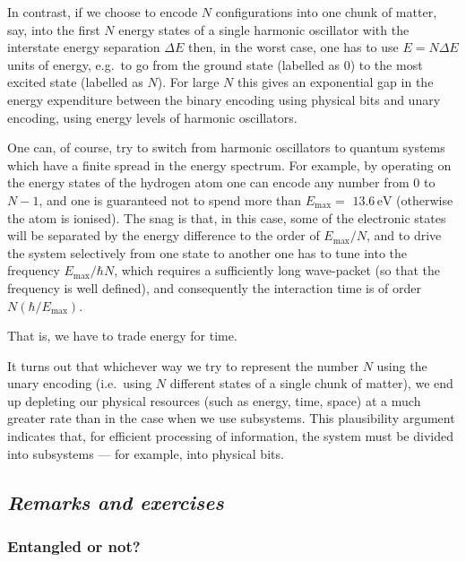 \documentclass[fleqn]{article}
\begin{document}
In contrast, if we choose to encode \(N\) configurations into one chunk of matter, say, into the first \(N\) energy states of a single harmonic oscillator with the interstate energy separation \(\Delta E\) then, in the worst case, one has to use \(E=N\Delta E\) units of energy, e.g.~to go from the ground state (labelled as \(0\)) to the most excited state (labelled as \(N\)).
For large \(N\) this gives an exponential gap in the energy expenditure between the binary encoding using physical bits and unary encoding, using energy levels of harmonic oscillators.

One can, of course, try to switch from harmonic oscillators to quantum systems which have a finite spread in the energy spectrum.
For example, by operating on the energy states of the hydrogen atom one can encode any number from \(0\) to \(N-1\), and one is guaranteed not to spend more than \(E_{\mathrm{max}}=\) \(13.6\,\mathrm{eV}\) (otherwise the atom is ionised).
The snag is that, in this case, some of the electronic states will be separated by the energy difference to the order of \(E_{\mathrm{max}}/N\), and to drive the system selectively from one state to another one has to tune into the frequency \(E_{\mathrm{max}}/\hbar N\), which requires a sufficiently long wave-packet (so that the frequency is well defined), and consequently the
interaction time is of order \(N(\hbar/E_{\mathrm{max}})\).

That is, we have to trade energy for time.

It turns out that whichever way we try to represent the number \(N\) using the unary encoding (i.e.~using \(N\) different states of a single chunk of matter), we end up depleting our physical resources (such as energy, time, space) at a much greater rate than in the case when we use subsystems.
This plausibility argument indicates that, for efficient processing of information, the system must be divided into subsystems --- for example, into physical bits.

\hypertarget{remarks-and-exercises-4}{%
\subsection{\texorpdfstring{\emph{Remarks and exercises}}{Remarks and exercises}}\label{remarks-and-exercises-4}}

\hypertarget{entangled-or-not}{%
\subsubsection{Entangled or not?}\label{entangled-or-not}}
\end{document}
